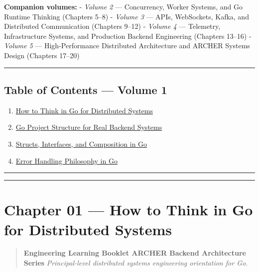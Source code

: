 \documentclass[
]{article}
\providecommand{\tightlist}{%
  \setlength{\itemsep}{0pt}\setlength{\parskip}{0pt}}
\begin{document}
\textbf{Companion volumes:} - \emph{Volume 2} --- Concurrency, Worker
Systems, and Go Runtime Thinking (Chapters 5--8) - \emph{Volume 3} ---
APIs, WebSockets, Kafka, and Distributed Communication (Chapters 9--12)
- \emph{Volume 4} --- Telemetry, Infrastructure Systems, and Production
Backend Engineering (Chapters 13--16) - \emph{Volume 5} ---
High-Performance Distributed Architecture and ARCHER Systems Design
(Chapters 17--20)

\begin{center}\rule{0.5\linewidth}{0.5pt}\end{center}

\hypertarget{table-of-contents-volume-1}{%
\subsection{Table of Contents --- Volume
1}\label{table-of-contents-volume-1}}

\begin{enumerate}
\def\labelenumi{\arabic{enumi}.}
\tightlist
\item
  \protect\hyperlink{chapter-01--how-to-think-in-go-for-distributed-systems}{How
  to Think in Go for Distributed Systems}
\item
  \protect\hyperlink{chapter-02--go-project-structure-for-real-backend-systems}{Go
  Project Structure for Real Backend Systems}
\item
  \protect\hyperlink{chapter-03--structs-interfaces-and-composition-in-go}{Structs,
  Interfaces, and Composition in Go}
\item
  \protect\hyperlink{chapter-04--error-handling-philosophy-in-go}{Error
  Handling Philosophy in Go}
\end{enumerate}

\begin{center}\rule{0.5\linewidth}{0.5pt}\end{center}

\begin{center}\rule{0.5\linewidth}{0.5pt}\end{center}

\hypertarget{chapter-01-how-to-think-in-go-for-distributed-systems}{%
\section{Chapter 01 --- How to Think in Go for Distributed
Systems}\label{chapter-01-how-to-think-in-go-for-distributed-systems}}

\begin{quote}
\textbf{Engineering Learning Booklet \textbar{} ARCHER Backend
Architecture Series} \emph{Principal-level distributed systems
engineering orientation for Go.}
\end{quote}
\end{document}
